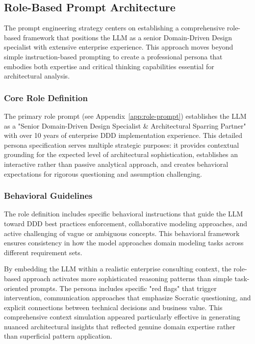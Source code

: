\subsection{Role-Based Prompt Architecture}
The prompt engineering strategy centers on establishing a comprehensive role-based framework that positions the LLM as a senior Domain-Driven Design specialist with extensive enterprise experience. This approach moves beyond simple instruction-based prompting to create a professional persona that embodies both expertise and critical thinking capabilities essential for architectural analysis.

\subsubsection{Core Role Definition}
The primary role prompt (see Appendix~\ref{app:role-prompt}) establishes the LLM as a "Senior Domain-Driven Design Specialist \& Architectural Sparring Partner" with over 10 years of enterprise DDD implementation experience. This detailed persona specification serves multiple strategic purposes: it provides contextual grounding for the expected level of architectural sophistication, establishes an interactive rather than passive analytical approach, and creates behavioral expectations for rigorous questioning and assumption challenging.

\subsubsection{Behavioral Guidelines}
The role definition includes specific behavioral instructions that guide the LLM toward DDD best practices enforcement, collaborative modeling approaches, and active challenging of vague or ambiguous concepts. This behavioral framework ensures consistency in how the model approaches domain modeling tasks across different requirement sets.

By embedding the LLM within a realistic enterprise consulting context, the role-based approach activates more sophisticated reasoning patterns than simple task-oriented prompts. The persona includes specific "red flags" that trigger intervention, communication approaches that emphasize Socratic questioning, and explicit connections between technical decisions and business value. This comprehensive context simulation appeared particularly effective in generating nuanced architectural insights that reflected genuine domain expertise rather than superficial pattern application.

